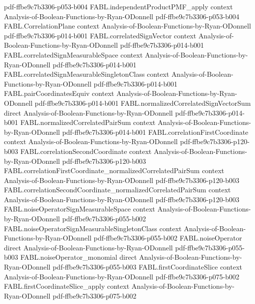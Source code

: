 \begin{theorem}
  {pdf-ffbe9c7b3306-p053-b004}
\proofstep
  {FABL.independentProductPMF_apply}
  {context}
  {Analysis-of-Boolean-Functions-by-Ryan-ODonnell}
  {pdf-ffbe9c7b3306-p053-b004}
\proofstep
  {FABL.CorrelationPlane}
  {context}
  {Analysis-of-Boolean-Functions-by-Ryan-ODonnell}
  {pdf-ffbe9c7b3306-p014-b001}
\proofstep
  {FABL.correlatedSignVector}
  {context}
  {Analysis-of-Boolean-Functions-by-Ryan-ODonnell}
  {pdf-ffbe9c7b3306-p014-b001}
\proofstep
  {FABL.correlatedSignMeasurableSpace}
  {context}
  {Analysis-of-Boolean-Functions-by-Ryan-ODonnell}
  {pdf-ffbe9c7b3306-p014-b001}
\proofstep
  {FABL.correlatedSignMeasurableSingletonClass}
  {context}
  {Analysis-of-Boolean-Functions-by-Ryan-ODonnell}
  {pdf-ffbe9c7b3306-p014-b001}
\proofstep
  {FABL.pairCoordinatesEquiv}
  {context}
  {Analysis-of-Boolean-Functions-by-Ryan-ODonnell}
  {pdf-ffbe9c7b3306-p014-b001}
\proofstep
  {FABL.normalizedCorrelatedSignVectorSum}
  {direct}
  {Analysis-of-Boolean-Functions-by-Ryan-ODonnell}
  {pdf-ffbe9c7b3306-p014-b001}
\proofstep
  {FABL.normalizedCorrelatedPairSum}
  {context}
  {Analysis-of-Boolean-Functions-by-Ryan-ODonnell}
  {pdf-ffbe9c7b3306-p014-b001}
\proofstep
  {FABL.correlationFirstCoordinate}
  {context}
  {Analysis-of-Boolean-Functions-by-Ryan-ODonnell}
  {pdf-ffbe9c7b3306-p120-b003}
\proofstep
  {FABL.correlationSecondCoordinate}
  {context}
  {Analysis-of-Boolean-Functions-by-Ryan-ODonnell}
  {pdf-ffbe9c7b3306-p120-b003}
\proofstep
  {FABL.correlationFirstCoordinate_normalizedCorrelatedPairSum}
  {context}
  {Analysis-of-Boolean-Functions-by-Ryan-ODonnell}
  {pdf-ffbe9c7b3306-p120-b003}
\proofstep
  {FABL.correlationSecondCoordinate_normalizedCorrelatedPairSum}
  {context}
  {Analysis-of-Boolean-Functions-by-Ryan-ODonnell}
  {pdf-ffbe9c7b3306-p120-b003}
\proofstep
  {FABL.noiseOperatorSignMeasurableSpace}
  {context}
  {Analysis-of-Boolean-Functions-by-Ryan-ODonnell}
  {pdf-ffbe9c7b3306-p055-b002}
\proofstep
  {FABL.noiseOperatorSignMeasurableSingletonClass}
  {context}
  {Analysis-of-Boolean-Functions-by-Ryan-ODonnell}
  {pdf-ffbe9c7b3306-p055-b002}
\proofstep
  {FABL.noiseOperator}
  {direct}
  {Analysis-of-Boolean-Functions-by-Ryan-ODonnell}
  {pdf-ffbe9c7b3306-p055-b003}
\proofstep
  {FABL.noiseOperator_monomial}
  {direct}
  {Analysis-of-Boolean-Functions-by-Ryan-ODonnell}
  {pdf-ffbe9c7b3306-p055-b003}
\proofstep
  {FABL.firstCoordinateSlice}
  {context}
  {Analysis-of-Boolean-Functions-by-Ryan-ODonnell}
  {pdf-ffbe9c7b3306-p075-b002}
\proofstep
  {FABL.firstCoordinateSlice_apply}
  {context}
  {Analysis-of-Boolean-Functions-by-Ryan-ODonnell}
  {pdf-ffbe9c7b3306-p075-b002}

\end{theorem}
